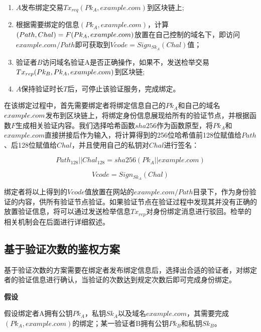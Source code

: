 \begin{enumerate}
	\item $A$发布绑定交易$Tx_{req}(Pk_A, example.com)$到区块链上;
	\item 根据需要绑定的信息$(Pk_A, example.com)$，计算$(Path, Chal) = F(Pk_A, example.c\\om)$放置在自己控制的域名下，即访问$example.com/Path$即可获取到$Vcode = Sign_{Sk_A}(Chal)$值；
	\item 验证者$B$访问域名验证A是否正确操作，如果不，发送检举交易$Tx_{rep}(Pk_B, Pk_A, ex\\ample.com)$到区块链;
	\item $A$保持验证时长$T$后，可停止该验证服务，完成绑定。
\end{enumerate}


在该绑定过程中，首先需要绑定者将绑定信息自己的$Pk_A$和自己的域名$example.c\\om$发布到区块链上，将绑定身份信息展现给所有的验证节点，并根据函数$F$生成相关验证内容。我们选择哈希函数$sha256$作为函数原型，将$Pk_A$和$example.com$直接拼接后作为输入，将计算得到的256位哈希值前128位赋值给$Path$、后128位赋值给$Chal$，并且使用自己的私钥对$Chal$进行签名：

\begin{equation}\label{eqF}
Path_{128}||Chal_{128} = sha256(Pk_A||example.com)
\end{equation}

\begin{equation}\label{eqSign}
Vcode = Sign_{Sk_A}(Chal)
\end{equation}

绑定者将以上得到的$Vcode$值放置在网站的$example.com/Path$目录下，作为身份验证的内容，供所有验证节点验证。如果验证节点在验证过程中发现其并没有正确的放置验证信息，将可以通过发送检举信息$Tx_{rep}$对身份绑定消息进行驳回。检举的相关机制会在后面进行详细叙述。


\subsection{基于验证次数的鉴权方案}\label{ver_num}

基于验证次数的方案需要在绑定者发布绑定信息后，选择出合适的验证者，对绑定者的验证信息进行确认，当验证的次数达到规定次数后即可完成身份绑定。

\noindent\textbf{假设}

假设绑定者A拥有公钥$Pk_A$，私钥$Sk_A$以及域名$example.com$，其需要完成$(Pk_A, example.com)$的绑定；某一验证者B拥有公钥$Pk_B$和私钥$Sk_B$。

